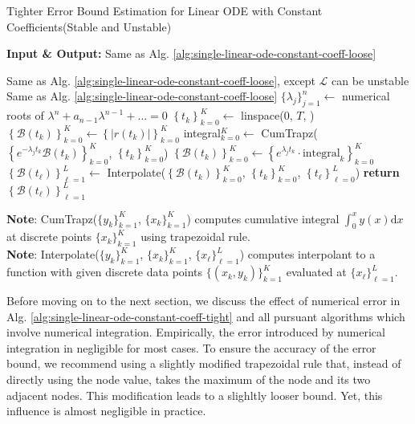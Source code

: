\documentclass[accepted]{uai2023}
\newcommand{\Bound}{\mathcal{B}}
\renewcommand{\L}{\mathcal{L}}
\begin{document}
    \begin{algorithm}
        \small
        \caption{Tighter Error Bound Estimation for Linear ODE with Constant Coefficients\quad  (Stable and Unstable)}\label{alg:single-linear-ode-constant-coeff-tight}
        \textbf{Input \& Output:} Same as Alg. \ref{alg:single-linear-ode-constant-coeff-loose}
        \begin{algorithmic}
            \Require Same as Alg. \ref{alg:single-linear-ode-constant-coeff-loose}, except $\L$ can be unstable
            \Ensure Same as Alg. \ref{alg:single-linear-ode-constant-coeff-loose}
            \State $\{\lambda_j\}_{j=1}^{n} \gets$ numerical roots of $\lambda^n+a_{n-1}\lambda^{n-1}+\dots=0$
            \State $\left\{t_k\right\}_{k=0}^{K} \gets$ linspace($0$, $T$, )
            \State $\left\{\Bound(t_k)\right\}_{k=0}^{K} \gets \left\{|r(t_k)|\right\}_{k=0}^{K}$
                \State integral$_{k=0}^{K} \gets$ CumTrapz($\left\{e^{-\lambda_j t_{k}} \Bound(t_k)\right\}_{k=0}^{K}$, $\left\{t_k\right\}_{k=0}^{K}$) 
                \State $\left\{\Bound(t_k)\right\}_{k=0}^{K} \gets \left\{e^{\lambda_j t_{k}}\cdot \text{integral}_k \right\}_{k=0}^{K}$ 
            \EndFor
            \State $\left\{\Bound(t_\ell)\right\}_{\ell=1}^{L} \gets $ Interpolate($\left\{\Bound(t_k)\right\}_{k=0}^{K}$, $\left\{t_k\right\}_{k=0}^{K}$, $\left\{t_\ell\right\}_{\ell=0}^{L}$) 
            \State \textbf{return} $\left\{\Bound(t_\ell)\right\}_{\ell=1}^{L}$ 
        \end{algorithmic}

        \vspace{0.5em} 
        \textbf{Note}: CumTrapz($\{y_k\}_{k=1}^K$, $\{x_k\}_{k=1}^K$) computes cumulative integral $\int_{0}^x y(x)\mathrm{d}x$ at discrete points $\{x_k\}_{k=1}^K$ using trapezoidal rule.\\
        \textbf{Note}: Interpolate($\{y_k\}_{k=1}^K$, $\{x_k\}_{k=1}^K$, $\{x_\ell\}_{\ell=1}^L$) computes interpolant to a function with given discrete data points $\{(x_k, y_k)\}_{k=1}^K$ evaluated at $\{x_\ell\}_{\ell=1}^L$.
    \end{algorithm}

    Before moving on to the next section, we discuss the effect of numerical error in Alg. \ref{alg:single-linear-ode-constant-coeff-tight} and all pursuant algorithms which involve numerical integration.
    Empirically, the error introduced by numerical integration in negligible for most cases.
    To ensure the accuracy of the error bound, we recommend using a slightly modified trapezoidal rule that, instead of directly using the node value,  takes the maximum of the node and its two adjacent nodes.
    This modification leads to a slighltly looser bound.
    Yet, this influence is almost negligible in practice.
\end{document}
